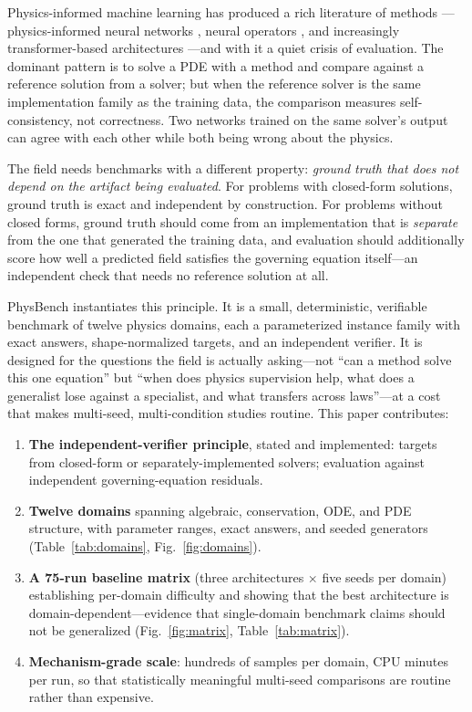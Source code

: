 \documentclass[11pt,a4paper]{article}
\begin{document}
Physics-informed machine learning has produced a rich literature of methods
---physics-informed neural networks \cite{raissi2019physics,
karniadakis2021physics}, neural operators \cite{li2021fourier, lu2021deeponet},
and increasingly transformer-based architectures \cite{liu2024physics}---and
with it a quiet crisis of evaluation. The dominant pattern is to solve a
PDE with a method and compare against a reference solution from a solver; but
when the reference solver is the same implementation family as the training
data, the comparison measures self-consistency, not correctness. Two networks
trained on the same solver's output can agree with each other while both
being wrong about the physics.

The field needs benchmarks with a different property: \emph{ground truth
that does not depend on the artifact being evaluated}. For problems with
closed-form solutions, ground truth is exact and independent by construction.
For problems without closed forms, ground truth should come from an
implementation that is \emph{separate} from the one that generated the
training data, and evaluation should additionally score how well a predicted
field satisfies the governing equation itself---an independent check that
needs no reference solution at all.

PhysBench instantiates this principle. It is a small, deterministic,
verifiable benchmark of twelve physics domains, each a parameterized instance
family with exact answers, shape-normalized targets, and an independent
verifier. It is designed for the questions the field is actually asking---not
``can a method solve this one equation'' but ``when does physics supervision
help, what does a generalist lose against a specialist, and what transfers
across laws''---at a cost that makes multi-seed, multi-condition studies
routine. This paper contributes:

\begin{enumerate}[leftmargin=1.6em,itemsep=0.2em]
  \item \textbf{The independent-verifier principle}, stated and implemented:
  targets from closed-form or separately-implemented solvers; evaluation
  against independent governing-equation residuals.
  \item \textbf{Twelve domains} spanning algebraic, conservation, ODE, and PDE
  structure, with parameter ranges, exact answers, and seeded generators
  (Table~\ref{tab:domains}, Fig.~\ref{fig:domains}).
  \item \textbf{A 75-run baseline matrix} (three architectures $\times$ five
  seeds per domain) establishing per-domain difficulty and showing that the
  best architecture is domain-dependent---evidence that single-domain
  benchmark claims should not be generalized (Fig.~\ref{fig:matrix},
  Table~\ref{tab:matrix}).
  \item \textbf{Mechanism-grade scale}: hundreds of samples per domain, CPU
  minutes per run, so that statistically meaningful multi-seed comparisons
  are routine rather than expensive.
\end{enumerate}
\end{document}

